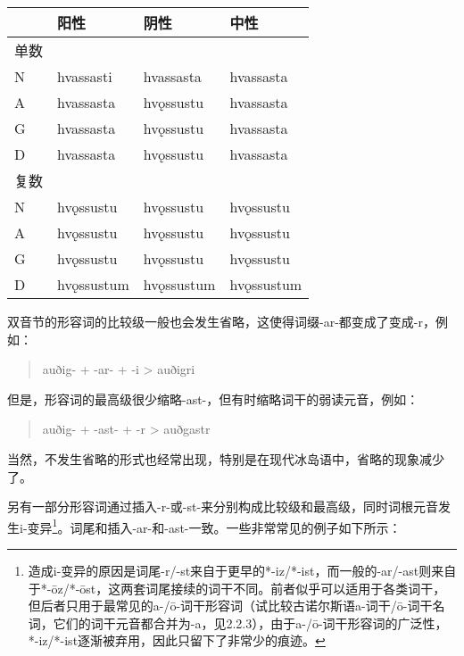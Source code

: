 \begin{longtable}{llll}
\toprule
 & 阳性 & 阴性 & 中性 \\
\midrule
\endhead
\bottomrule
\endfoot
单数 & & & \\
N & hvassasti & hvassasta & hvassasta \\
A & hvassasta & hvǫssustu & hvassasta \\
G & hvassasta & hvǫssustu & hvassasta \\
D & hvassasta & hvǫssustu & hvassasta \\
复数 & & & \\
N & hvǫssustu & hvǫssustu & hvǫssustu \\
A & hvǫssustu & hvǫssustu & hvǫssustu \\
G & hvǫssustu & hvǫssustu & hvǫssustu \\
D & hvǫssustum & hvǫssustum & hvǫssustum \\
\end{longtable}

双音节的形容词的比较级一般也会发生省略，这使得词缀-ar-都变成了变成-r，例如：

\begin{quote}
auðig- + -ar- + -i \textgreater{} auðigri
\end{quote}

但是，形容词的最高级很少缩略-ast-，但有时缩略词干的弱读元音，例如：

\begin{quote}
auðig- + -ast- + -r \textgreater{} auðgastr
\end{quote}

当然，不发生省略的形式也经常出现，特别是在现代冰岛语中，省略的现象减少了。

另有一部分形容词通过插入-r-或-st-来分别构成比较级和最高级，同时词根元音发生i-变异\footnote{造成i-变异的原因是词尾-r/-st来自于更早的*-iz/*-ist，而一般的-ar/-ast则来自于*-ōz/*-ōst，这两套词尾接续的词干不同。前者似乎可以适用于各类词干，但后者只用于最常见的a-/ō-词干形容词（试比较古诺尔斯语a-词干/ō-词干名词，它们的词干元音都合并为-a，见2.2.3），由于a-/ō-词干形容词的广泛性，*-iz/*-ist逐渐被弃用，因此只留下了非常少的痕迹。}。词尾和插入-ar-和-ast-一致。一些非常常见的例子如下所示：

